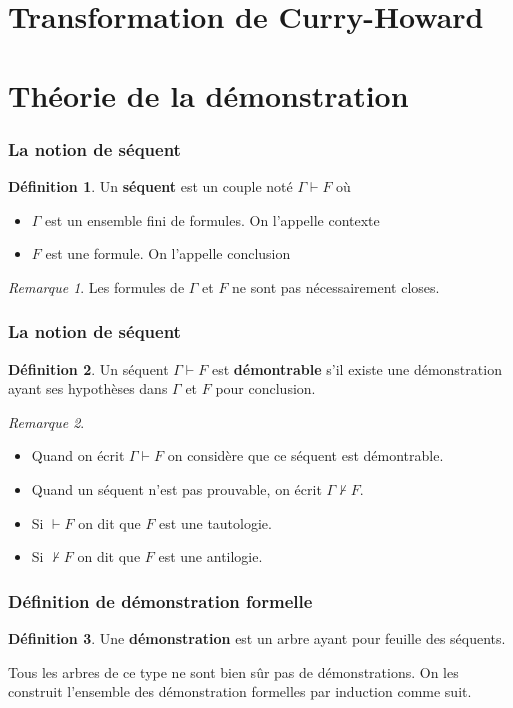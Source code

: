 \documentclass[11pt,a4paper]{beamer}
\theoremstyle{plain}
\theoremstyle{definition}
\newtheorem{defn}{Définition}[section]
\theoremstyle{remark}
\newtheorem*{rem}{Remarque}
\begin{document}
\section{Transformation de Curry-Howard}

\section{Théorie de la démonstration}
\begin{frame}
\frametitle{La notion de séquent}
\begin{defn}
Un \textbf{séquent} est un couple noté $\Gamma \vdash F$ où
\begin{itemize}
	\item $\Gamma$ est un ensemble fini de formules. On l'appelle contexte
	\item $F$ est une formule. On l'appelle conclusion
\end{itemize}
\end{defn}

\begin{rem}
Les formules de $\Gamma$ et $F$ ne sont pas nécessairement closes.
\end{rem}
\end{frame}

\begin{frame}
\frametitle{La notion de séquent}
\begin{defn}
Un séquent $\Gamma \vdash F$ est \textbf{démontrable} s'il existe une démonstration ayant ses hypothèses dans $\Gamma$ et $F$ pour conclusion.
\end{defn}

\begin{rem}
\begin{itemize}
	\item Quand on écrit $\Gamma \vdash F$ on considère que ce séquent est démontrable.
	\item Quand un séquent n'est pas prouvable, on écrit $\Gamma \nvdash F$.
	\item Si $\vdash F$ on dit que $F$ est une tautologie.
	\item Si $\nvdash F$ on dit que $F$ est une antilogie.
\end{itemize}
\end{rem}
\end{frame}

\begin{frame}
\frametitle{Définition de démonstration formelle}
\begin{defn}
Une \textbf{démonstration} est un arbre ayant pour feuille des séquents.

Tous les arbres de ce type ne sont bien sûr pas de démonstrations. On les construit l'ensemble des démonstration formelles par induction comme suit.
\end{defn}
\end{frame}
\end{document}
